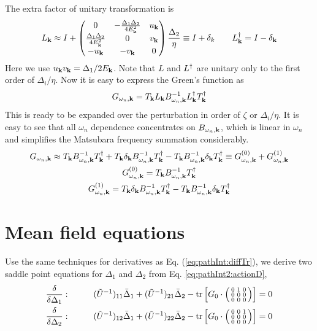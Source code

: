 The extra factor of unitary transformation is 
\begin{equation}\label{eq:pathInt2:L1}
L_{\mathbf{k}}\approx{}I+
\begin{pmatrix}0&-\frac{\Delta_{1}{}\Delta_{2}{}}{4E^{2}_{\mathbf{k}}}&u_{\mathbf{k}}\\
\frac{\Delta_{1}{}\Delta_{2}{}}{4E^{2}_{\mathbf{k}}}&0&v_{\mathbf{k}}\\
-u_{\mathbf{k}}&-v_{\mathbf{k}}&0
\end{pmatrix}\frac{\Delta_{2}{}}{\eta}
\equiv{}I+\delta_{k}\qquad
L^{\dagger}_{\mathbf{k}}=I-\delta_{\mathbf{k}}
\end{equation}
Here we use $u_{\mathbf{k}}v_{\mathbf{k}}=\Delta_{1}/2E_{\mathbf{k}}$.    Note that $L$ and $L^{\dagger}$ are unitary only to the first order of $\Delta_{i}/\eta$.
Now it is easy to express the Green's function as
\begin{equation}
G_{\omega_{n},\mathbf{k}}=T_{\mathbf{k}}L_{\mathbf{k}}B_{\omega_{n},\mathbf{k}}^{-1}L_{\mathbf{k}}^{\dagger}T_{\mathbf{k}}^{\dagger}
\end{equation}
This is ready to be expanded over the perturbation in order of  $\zeta$ or $\Delta_{i}/\eta$.  It is easy to see that all $\omega_{n}$ dependence concentrates on $B_{\omega_{n},\mathbf{k}}$, which is linear in $\omega_{n}$  and simplifies the Matsubara frequency summation considerably.   
\begin{subequations}\label{eq:pathInt2:Gexpand}
\begin{gather}
G_{\omega_{n},\mathbf{k}}\approx{}T_{\mathbf{k}}B_{\omega_{n},\mathbf{k}}^{-1}T_{\mathbf{k}}^{\dagger}+T_{\mathbf{k}}\delta_{\mathbf{k}}B_{\omega_{n},\mathbf{k}}^{-1}T_{\mathbf{k}}^{\dagger}
	-T_{\mathbf{k}}B_{\omega_{n},\mathbf{k}}^{-1}\delta_{\mathbf{k}}T_{\mathbf{k}}^{\dagger}
	\equiv{}G_{\omega_{n},\mathbf{k}}^{(0)}+G_{\omega_{n},\mathbf{k}}^{(1)}\\
	G_{\omega_{n},\mathbf{k}}^{(0)}=T_{\mathbf{k}}B_{\omega_{n},\mathbf{k}}^{-1}T_{\mathbf{k}}^{\dagger}\\
	G_{\omega_{n},\mathbf{k}}^{(1)}=T_{\mathbf{k}}\delta_{\mathbf{k}}B_{\omega_{n},\mathbf{k}}^{-1}T_{\mathbf{k}}^{\dagger}
	-T_{\mathbf{k}}B_{\omega_{n},\mathbf{k}}^{-1}\delta_{\mathbf{k}}T_{\mathbf{k}}^{\dagger}
\end{gather}
\end{subequations}



\section{Mean field equations \label{sec:pathInt2:meanfield}}
Use the same techniques for derivatives as Eq. (\ref{eq:pathInt:diffTr}), we derive two saddle point equations for $\Delta_{1}$ and $\Delta_{2}$ from Eq. \eqref{eq:pathInt2:actionD},
 \begin{align}
\frac{\delta}{\delta{}\Delta_{1}}:&\qquad&
(\tilde{U}^{-1})_{11}\bar{\Delta}_{1}+(\tilde{U}^{-1})_{21}\bar{\Delta}_{2}-\text{tr}\left[{G_{0}}\cdot\left(\begin{smallmatrix}0&1&0\\0&0&0\\0&0&0\end{smallmatrix}\right)\right]=0
\label{eq:pathInt2:mf01}\\
\frac{\delta}{\delta{}\Delta_{2}}:&\qquad&
(\tilde{U}^{-1})_{12}\bar{\Delta}_{1}+(\tilde{U}^{-1})_{22}\bar{\Delta}_{2}-\text{tr}\left[{G_{0}}\cdot\left(\begin{smallmatrix}0&0&1\\0&0&0\\0&0&0\end{smallmatrix}\right)\right]=0
\label{eq:pathInt2:mf02}
 \end{align}
 
